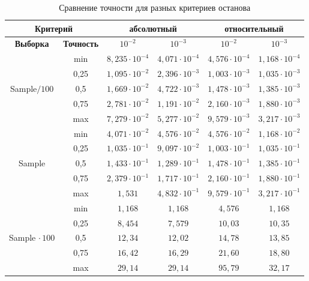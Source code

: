 \begin{table}[!hhh]
 \caption{Сравнение точности для разных критериев останова}
    \label{table: abs_rel_crit_eps}
\centering
\begin{tabular}{|c|c|c|c|c|c|}
\hline
\multicolumn{2}{|c|}{\textbf{Критерий}} & \multicolumn{2}{c|}{\textbf{абсолютный}} & \multicolumn{2}{c|}{\textbf{относительный}} \\
\hline
\textbf{Выборка} & \textbf{Точность} & $10^{-2}$ & $10^{-3}$ & $10^{-2}$ & $10^{-3}$ \\
\hline
\multirow{5}{*}{Sample$/100$} & min & $8,235 \cdot 10^{-4}$ & $4,071 \cdot 10^{-4}$ & $4,576 \cdot 10^{-4}$ & $1,168 \cdot 10^{-4}$ \\
\cline{2-6}
& 0,25 & $1,095 \cdot 10^{-2}$ & $2,396 \cdot 10^{-3}$ & $1,003 \cdot 10^{-3}$ & $1,035 \cdot 10^{-3}$ \\
\cline{2-6}
& 0,5 & $1,669 \cdot 10^{-2}$ & $4,722 \cdot 10^{-3}$ & $1,478 \cdot 10^{-3}$ & $1,385 \cdot 10^{-3}$ \\
\cline{2-6}
& 0,75 & $2,781 \cdot 10^{-2}$ & $1,191 \cdot 10^{-2}$ & $2,160 \cdot 10^{-3}$ & $1,880 \cdot 10^{-3}$ \\
\cline{2-6}
& max & $7,279 \cdot 10^{-2}$ & $5,277 \cdot 10^{-2}$ & $9,579 \cdot 10^{-3}$ & $3,217\cdot 10^{-3}$ \\
\hline

\multirow{5}{*}{Sample} & min & $4,071 \cdot 10^{-2}$ & $4,576 \cdot 10^{-2}$ & $4,576 \cdot 10^{-2}$ & $1,168 \cdot 10^{-2}$ \\
\cline{2-6}
& 0,25 & $1,035 \cdot 10^{-1}$ & $9,097 \cdot 10^{-2}$ & $1,003 \cdot 10^{-1}$ & $1,035 \cdot 10^{-1}$ \\
\cline{2-6}
& 0,5 & $1,433 \cdot 10^{-1}$ & $1,289 \cdot 10^{-1}$ & $1,478 \cdot 10^{-1}$ & $1,385 \cdot 10^{-1}$ \\
\cline{2-6}
& 0,75 & $2,379 \cdot 10^{-1}$ & $1,717 \cdot 10^{-1}$ & $2,160 \cdot 10^{-1}$ & $1,880 \cdot 10^{-1}$ \\
\cline{2-6}
& max & $1,531 $ & $4,832 \cdot 10^{-1}$ & $9,579  \cdot 10^{-1} $ & $3,217  \cdot 10^{-1} $ \\
\hline

\multirow{5}{*}{Sample$\, \cdot 100$} & min & $1,168$ & $1,168$ & $4,576$ & $1,168$ \\
\cline{2-6}
& 0,25 & $8,454$ & $7,579$ & $10,03$ & $10,35$ \\
\cline{2-6}
& 0,5 & $12,34$ & $12,02$ & $14,78$ & $13,85$ \\
\cline{2-6}
& 0,75 & $16,42$ & $16,29$ & $21,60$ & $18,80$ \\
\cline{2-6}
& max & $29,14$ & $29,14$ & $95,79$ & $32,17$ \\
\hline
\end{tabular}
\end{table}


